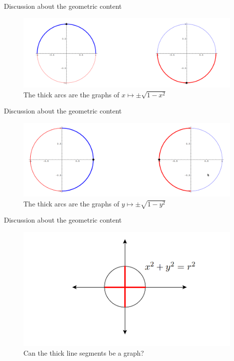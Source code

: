 \begin{frame}{Discussion about the geometric content}
    \begin{figure}[h!]
        \includegraphics[width=0.75\linewidth]{figures/implicit_function_example02.png}
        \caption{The thick arcs are the graphs of $x \mapsto \pm \sqrt{1-x^2}$}
    \end{figure}
\end{frame}

\begin{frame}{Discussion about the geometric content}
    \begin{figure}[h!]
        \includegraphics[width=0.75\linewidth]{figures/implicit_function_example03.png}
        \caption{The thick arcs are the graphs of $y \mapsto \pm \sqrt{1-y^2}$}
    \end{figure}
\end{frame}

\begin{frame}{Discussion about the geometric content}
    \begin{figure}[h!]
        \includegraphics[width=0.75\linewidth]{figures/implicit_function_example04.png}
        \caption{Can the thick line segments be a graph?}
    \end{figure}
\end{frame}


